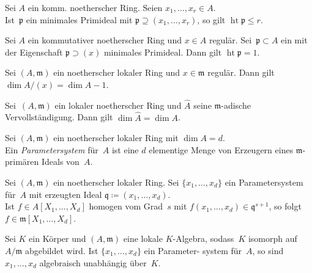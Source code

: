 \documentclass{cheat-sheet}
\DeclareMathOperator{\height}{ht} %
\newcommand{\ppp}{\mathfrak{p}}
\newcommand{\qqq}{\mathfrak{q}}
\newcommand{\mmm}{\mathfrak{m}}
\begin{document}
\begin{kor}
  Sei $A$ ein komm. noetherscher Ring.
  Seien $x_1, \ldots, x_r \in A$. \\
  Ist~$\ppp$ ein minimales Primideal mit $\ppp \supseteq (x_1, \ldots, x_r)$, so gilt $\height \ppp \leq r$.
\end{kor}

\begin{kor}
  Sei $A$ ein kommutativer noetherscher Ring und $x \in A$ regulär.
  Sei~$\ppp \subset A$ ein mit der Eigenschaft $\ppp \supset (x)$ minimales Primideal.
  Dann gilt $\height \ppp = 1$.
\end{kor}

\begin{kor}
  Sei $(A, \mmm)$ ein noetherscher lokaler Ring und $x \in \mmm$ regulär.
  Dann gilt $\dim A/(x) = \dim A - 1$.
\end{kor}

\begin{kor}
  Sei~$(A, \mmm)$ ein lokaler noetherscher Ring und $\hat{A}$ seine $\mmm$-adische Vervollständigung.
  Dann gilt $\dim \hat{A} = \dim A$.
\end{kor}


\begin{defn}
  Sei $(A, \mmm)$ ein noetherscher lokaler Ring mit $\dim A = d$. \\
  Ein \emph{Parametersystem} für~$A$ ist eine $d$ elementige Menge von Erzeugern eines $\mmm$-primären Ideals von~$A$.
\end{defn}

\begin{prop}
  Sei $(A, \mmm)$ ein noetherscher lokaler Ring.
  Sei $\{ x_1, \ldots, x_d \}$ ein Parametersystem für~$A$ mit erzeugten Ideal $\qqq \coloneqq (x_1, \ldots, x_d)$. \\
  Ist $f \in A [X_1, \ldots, X_d]$ homogen vom Grad~$s$ mit $f(x_1, \ldots, x_d) \in \qqq^{s+1}$, so folgt $f \in \mmm [X_1, \ldots, X_d]$.
\end{prop}

\begin{kor}
  Sei $K$ ein Körper und $(A, \mmm)$ eine lokale $K$-Algebra, sodass~$K$ isomorph auf $A/\mmm$ abgebildet wird.
  Ist $\{ x_1, \ldots, x_d \}$ ein Parameter- system für~$A$, so sind $x_1, \ldots, x_d$ algebraisch unabhängig über~$K$.
\end{kor}

\end{document}
